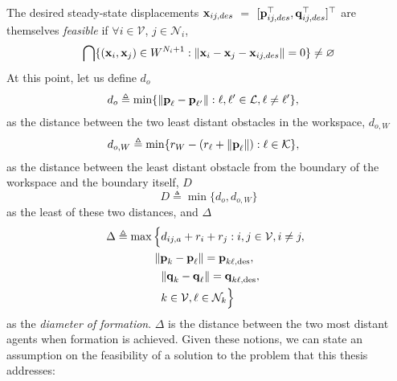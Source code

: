 The desired steady-state displacements
$\bm{\mathbf{x}}_{ij,des}$ $=$ $[\bm{\mathbf{p}}_{ij,des}^{\top}, \bm{\mathbf{q}}_{ij,des}^{\top}]^{\top}$
are themselves \textit{feasible} if $\forall i \in \mathcal{V}$,
$j \in \mathcal{N}_i$,
$$\bigcap \{(\bm{\mathbf{x}}_i, \bm{\mathbf{x}}_j) \in W^{N_i + 1} : \| \bm{\mathbf{x}}_i - \bm{\mathbf{x}}_j - \bm{\mathbf{x}}_{ij,des} \| = 0 \}
\ne \varnothing$$
At this point, let us define $d_o$
\begin{align*}
  d_o &\triangleq \min\{\| \bm{\mathbf{p}}_{\ell} - \bm{\mathbf{p}}_{\ell'}\| : \ell,\ell' \in \mathcal{L}, \ell \neq \ell' \},
\end{align*}
as the distance between the two least distant obstacles in the workspace,
$d_{o,W}$
\begin{align*}
  d_{o,W} & \triangleq \min\{r_W - \left( r_{\ell} + \| \bm{\mathbf{p}}_{\ell} \| \right) : \ell \in \mathcal{K}\},
\end{align*}
as the distance between the least distant obstacle from the boundary of the
workspace and the boundary itself, $D$
\begin{equation*}
  D \triangleq \min\{d_o, d_{o,W}\}
\end{equation*}
as the least of these two distances, and $\Delta$
\begin{align*}
  \hspace{-2mm} \Delta \triangleq \max\Big\{&d_{ij, a}+r_i+r_j: i, j \in \mathcal{V}, i \neq j, \notag \\
  &\hspace{-2mm} \| \vect{p}_k - \vect{p}_\ell \| = \vect{p}_{k \ell,\text{des}}, \\
  &\|\vect{q}_k - \vect{q}_\ell\| = \vect{q}_{k \ell,\text{des}}, \\
  &k \in \mathcal{V}, \ell \in \mathcal{N}_k\Big\}
\end{align*}
as the \emph{diameter of formation}. $\Delta$ is the distance between the two
most distant agents when formation is achieved. Given these notions, we
can state an assumption on the feasibility of a solution to the problem
that this thesis addresses:

